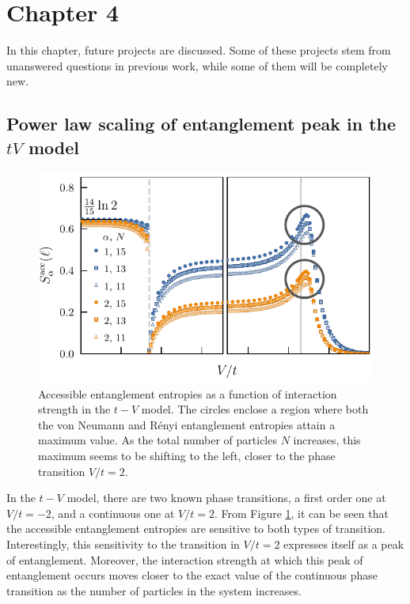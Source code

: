\section{Chapter 4}

	In this chapter, future projects are discussed. Some of these projects stem from unanswered questions in previous work, while some of them will be completely new.
	
	\subsection{Power law scaling of entanglement peak in the $tV$ model}
	
	\begin{figure}[h]
	\begin{center}
	\includegraphics[scale=1.0]{operationalEntanglementEntropies_SOP5_withPeakCircles.pdf}
	\end{center}
	\caption{Accessible entanglement entropies as a function of interaction strength in the $t-V$ model. The circles enclose a region where both the von Neumann and R\'enyi entanglement entropies attain a maximum value. As the total number of particles $N$ increases, this maximum seems to be shifting to the left, closer to the phase transition $V/t=2$.}
	\label{fig:OEE_circledPeaks}
	\end{figure}
	
	In the $t-V$ model, there are two known phase transitions, a first order one at $V/t=-2$, and a continuous one at $V/t=2$. From Figure \ref{fig:OEE_circledPeaks}, it can be seen that the accessible entanglement entropies are sensitive to both types of transition. Interestingly, this sensitivity to the transition in $V/t=2$ expresses itself as a peak of entanglement. Moreover, the interaction strength at which this peak of entanglement occurs moves closer to the exact value of the continuous phase transition as the number of particles in the system increases.  
	
